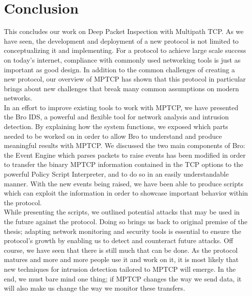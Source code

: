 


\chapter{Conclusion} \label{chap:conclusion}
This concludes our work on Deep Packet Inspection with Multipath TCP. As we have seen, the development and deployment of a new protocol is not limited to conceptualizing it and implementing. For a protocol to achieve large scale success on today's internet, compliance with commonly used networking tools is just as important as good design. In addition to the common challenges of creating a new protocol, our overview of MPTCP has shown that this protocol in particular brings about new challenges that break many common assumptions on modern networks.\\

In an effort to improve existing tools to work with MPTCP, we have presented the Bro IDS, a powerful and flexible tool for network analysis and intrusion detection. By explaining how the system functions, we exposed which parts needed to be worked on in order to allow Bro to understand and produce meaningful results with MPTCP. We discussed the two main components of Bro: the Event Engine which parses packets to raise events has been modified in order to transfer the binary MPTCP information contained in the TCP options to the powerful Policy Script Interpreter, and to do so in an easily understandable manner. With the new events being raised, we have been able to produce scripts which can exploit the information in order to showcase important behavior within the protocol. \\

While presenting the scripts, we outlined potential attacks that may be used in the future against the protocol. Doing so brings us back to original premise of the thesis; adapting network monitoring and security tools is essential to ensure the protocol's growth by enabling us to detect and counteract future attacks. Off course, we have seen that there is still much that can be done. As the protocol matures and more and more people use it and work on it, it is most likely that new techniques for intrusion detection tailored to MPTCP will emerge. In the end, we must bare mind one thing; if MPTCP changes the way we send data, it will also make us change the way we monitor these transfers.